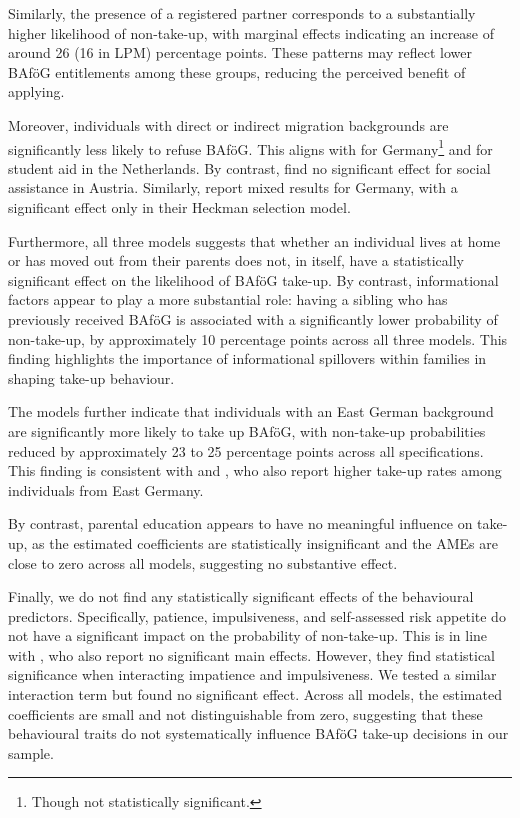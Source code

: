Similarly, the presence of a registered partner corresponds to a substantially higher likelihood of non-take-up, with marginal effects indicating an increase of around 26 (16 in LPM) percentage points. 
These patterns may reflect lower BAföG entitlements among these groups, reducing the perceived benefit of applying. 


Moreover, individuals with direct or indirect migration backgrounds are significantly less likely to refuse BAföG. 
This aligns with \cite{herber_non-take-up_2019} for Germany\footnote{Though not statistically significant.} and \cite{konijn_quantifying_2023} for student aid in the Netherlands. 
By contrast, \cite{fuchs_austria_2007} find no significant effect for social assistance in Austria. 
Similarly, \cite{frick_claim_2007} report mixed results for Germany, with a significant effect only in their Heckman selection model.

Furthermore, all three models suggests that whether an individual lives at home or has moved out from their parents does not, in itself, have a statistically significant effect on the likelihood of BAföG take-up. 
By contrast, informational factors appear to play a more substantial role: having a sibling who has previously received BAföG is associated with a significantly lower probability of non-take-up, by approximately 10 percentage points across all three models. 
This finding highlights the importance of informational spillovers within families in shaping take-up behaviour. 

The models further indicate that individuals with an East German background are significantly more likely to take up BAföG, with non-take-up probabilities reduced by approximately 23 to 25 percentage points across all specifications. 
This finding is consistent with \cite{herber_non-take-up_2019} and \cite{harnisch_nontakeup_2019}, who also report higher take-up rates among individuals from East Germany. 

By contrast, parental education appears to have no meaningful influence on take-up, as the estimated coefficients are statistically insignificant and the AMEs are close to zero across all models, suggesting no substantive effect.

Finally, we do not find any statistically significant effects of the behavioural predictors. 
Specifically, patience, impulsiveness, and self-assessed risk appetite do not have a significant impact on the probability of non-take-up. 
This is in line with \cite{herber_non-take-up_2019}, who also report no significant main effects. 
However, they find statistical significance when interacting impatience and impulsiveness. 
We tested a similar interaction term but found no significant effect. 
Across all models, the estimated coefficients are small and not distinguishable from zero, suggesting that these behavioural traits do not systematically influence BAföG take-up decisions in our sample.


